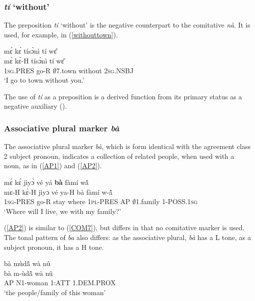 \subsubsection {{\itshape tí} `without'}

The preposition {\itshape tí} `without' is the negative counterpart to the comitative {\itshape nà}. It is used, for example, in (\ref{withouttown}).

\begin{exe}
\ex\label{withouttown}
  \glll    mɛ́ kɛ́ tísɔ̀nì tí wɛ̂\\
         mɛ́ kɛ̀-H tísɔ̀nì tí wɛ̂ \\
              1\textsc{sg}.PRES go-R $\emptyset$7.town without 2\textsc{sg}.NSBJ \\
    \trans `I go to town without you.'
\end {exe}


The use of {\itshape tí} as a preposition is a derived function from its primary status as a negative auxiliary ().


\subsubsection{Associative plural marker {\itshape bà}}
\label{sec:AP}

The associative plural marker {\itshape bà}, which is form identical with the agreement class 2 subject pronoun, indicates a collection of related people, when used with a noun, as in (\ref{AP1}) and (\ref{AP2}).

\begin{exe} 
\ex\label{AP1}
  \glll  mɛ́ kɛ́ jìyɔ̀ vé yá {\bfseries bà} fàmí wã̂ \\
          mɛ-H kɛ̀-H jìyɔ vé ya-H bà fàmí w-ã̂ \\
            1\textsc{sg}-PRES go-R stay where 1\textsc{pl}-PRES AP $\emptyset$1.family 1-POSS.1\textsc{sg} \\
    \trans `Where will I live, we with my family?'
\end{exe}

\noindent (\ref{AP2}) is similar to (\ref{COM7}), but differs in that no comitative marker is used. The tonal pattern of {\itshape ba} also differs: as the associative plural, {\itshape bà} has a L tone, as a subject pronoun, it has a H tone.

\begin{exe} 
\ex\label{AP2}
  \glll bà mùdã̂ wà nû \\
       bà m-ùdã̂ wà nû \\
          AP N1-woman 1:ATT 1.DEM.PROX  \\
    \trans `the people/family of this woman'
\end{exe}

